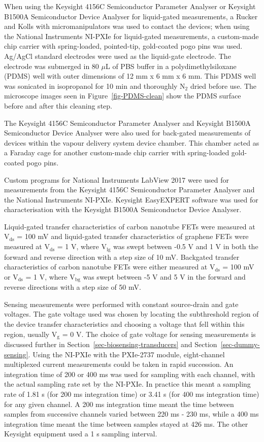 \documentclass[
  a4paper,
]{scrbook}
\begin{document}
When using the Keysight 4156C Semiconductor Parameter Analyser or
Keysight B1500A Semiconductor Device Analyser for liquid-gated
measurements, a Rucker and Kolls with micromanipulators was used to
contact the devices; when using the National Instruments NI-PXIe for
liquid-gated measurements, a custom-made chip carrier with
spring-loaded, pointed-tip, gold-coated pogo pins was used. Ag/AgCl
standard electrodes were used as the liquid-gate electrode. The
electrode was submerged in 80 \(\mu\)L of PBS buffer in a
polydimethylsiloxane (PDMS) well with outer dimensions of 12 mm x 6 mm x
6 mm. This PDMS well was sonicated in isopropanol for 10 min and
thoroughly N\(_2\) dried before use. The microscope images seen in
Figure~\ref{fig-PDMS-clean} show the PDMS surface before and after this
cleaning step.

The Keysight 4156C Semiconductor Parameter Analyser and Keysight B1500A
Semiconductor Device Analyser were also used for back-gated measurements
of devices within the vapour delivery system device chamber. This
chamber acted as a Faraday cage for another custom-made chip carrier
with spring-loaded gold-coated pogo pins.

Custom programs for National Instruments LabView 2017 were used for
measurements from the Keysight 4156C Semiconductor Parameter Analyser
and the National Instruments NI-PXIe. Keysight EasyEXPERT software was
used for characterisation with the Keysight B1500A Semiconductor Device
Analyser.

Liquid-gated transfer characteristics of carbon nanotube FETs were
measured at V\(_{\mathrm{ds}}\) = 100 mV and liquid-gated transfer
characteristics of graphene FETs were measured at V\(_{\mathrm{ds}}\) =
1 V, where V\(_{\mathrm{lg}}\) was swept between -0.5 V and 1 V in both
the forward and reverse direction with a step size of 10 mV. Backgated
transfer characteristics of carbon nanotube FETs were either measured at
V\(_{\mathrm{ds}}\) = 100 mV or V\(_{\mathrm{ds}}\) = 1 V, where
V\(_{\mathrm{bg}}\) was swept between -5 V and 5 V in the forward and
reverse directions with a step size of 50 mV.

Sensing measurements were performed with constant source-drain and gate
voltages. The gate voltage used was chosen by locating the subthreshold
region of the device transfer characteristics and choosing a voltage
that fell within this region, usually V\(_{\mathrm{g}}\) = 0 V. The
choice of gate voltage for sensing measurements is discussed further in
Section~\ref{sec-biosensing-transducers} and
Section~\ref{sec-dummy-sensing}. Using the NI-PXIe with the PXIe-2737
module, eight-channel multiplexed current measurements could be taken in
rapid succession. An integration time of 200 or 400 ms was used for
sampling with each channel, with the actual sampling rate set by the
NI-PXIe. In practice this meant a sampling rate of 1.81 s (for 200 ms
integration time) or 3.41 s (for 400 ms integration time) for any given
channel. A 200 ms integration time meant the time between samples from
successive channels varied between 220 ms - 230 ms, while a 400 ms
integration time meant the time between samples stayed at 426 ms. The
other Keysight equipment used a 1 s sampling interval.
\end{document}
